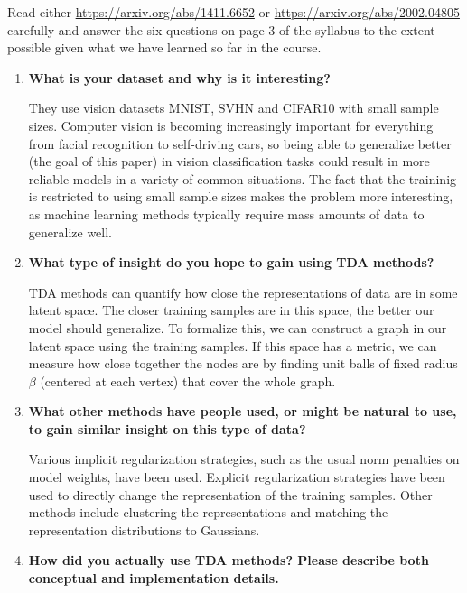 \documentclass[twoside,10pt]{article}
\begin{document}

\begin{exer}
        Read either \url{https://arxiv.org/abs/1411.6652} or \url{https://arxiv.org/abs/2002.04805} carefully and answer the six questions on page $3$ of the syllabus to the extent possible given what we have learned so far in the course.
\end{exer}

\begin{enumerate}
	\item \textbf{What is your dataset and why is it interesting?}

		They use vision datasets MNIST, SVHN and CIFAR10 with small sample sizes. Computer vision is becoming increasingly important for everything from facial recognition to self-driving cars, so being able to generalize better (the goal of this paper) in vision classification tasks could result in more reliable models in a variety of common situations. The fact that the traininig is restricted to using small sample sizes makes the problem more interesting, as machine learning methods typically require mass amounts of data to generalize well.

	\item \textbf{What type of insight do you hope to gain using TDA methods?}

		TDA methods can quantify how close the representations of data are in some latent space. The closer training samples are in this space, the better our model should generalize. To formalize this, we can construct a graph in our latent space using the training samples. If this space has a metric, we can measure how close together the nodes are by finding unit balls of fixed radius $\beta$ (centered at each vertex) that cover the whole graph.

	\item \textbf{What other methods have people used, or might be natural to use, to gain similar insight on this type of data?}

		Various implicit regularization strategies, such as the usual norm penalties on model weights, have been used. Explicit regularization strategies have been used to directly change the representation of the training samples. Other methods include clustering the representations and matching the representation distributions to Gaussians.

	\item \textbf{How did you actually use TDA methods? Please describe both conceptual and implementation details.}


\end{enumerate}
\end{document}
